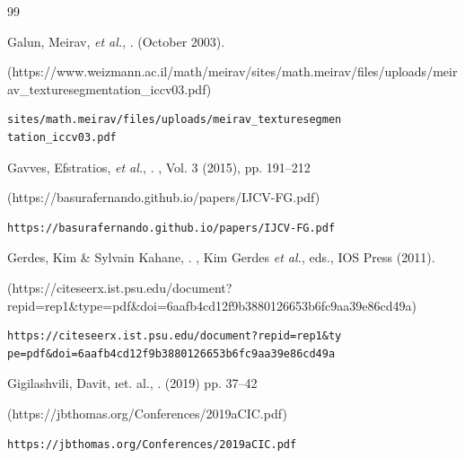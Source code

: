\begin{thebibliography}{99}
{\begin{bItem}[Galunetal]
Galun, Meirav, \textit{et al.},  
.
(October 2003).   
%
\begin{boxurl}(https://www.weizmann.ac.il/math/meirav/sites/math.meirav/files/uploads/meirav_texturesegmentation_iccv03.pdf)
\begin{lstlisting}
sites/math.meirav/files/uploads/meirav_texturesegmen
tation_iccv03.pdf
\end{lstlisting}
\end{boxurl}\end{bItem}






\begin{bItem}[Gavvesetal]
Gavves, Efstratios, \textit{et al.},  
.
, 
Vol. 3 (2015), pp. 191--212 
%
\begin{boxurl}(https://basurafernando.github.io/papers/IJCV-FG.pdf)
\begin{lstlisting}
https://basurafernando.github.io/papers/IJCV-FG.pdf
\end{lstlisting}
\end{boxurl}\end{bItem}








\begin{bItem}[GerdesKahane]
Gerdes, Kim \& Sylvain Kahane, 
.  
, 
Kim Gerdes \textit{et al.}, eds., 
IOS Press (2011).
%
\begin{boxurl}(https://citeseerx.ist.psu.edu/document?repid=rep1&type=pdf&doi=6aafb4cd12f9b3880126653b6fc9aa39e86cd49a)
\begin{lstlisting}
https://citeseerx.ist.psu.edu/document?repid=rep1&ty
pe=pdf&doi=6aafb4cd12f9b3880126653b6fc9aa39e86cd49a
\end{lstlisting}
\end{boxurl}\end{bItem}




\begin{bItem}[DavitGigilashvili]
Gigilashvili, Davit, \i{et. al.},
.
(2019) pp. 37--42
%
\begin{boxurl}(https://jbthomas.org/Conferences/2019aCIC.pdf)
\begin{lstlisting}
https://jbthomas.org/Conferences/2019aCIC.pdf
\end{lstlisting}
\end{boxurl}\end{bItem}



}
\end{thebibliography}
